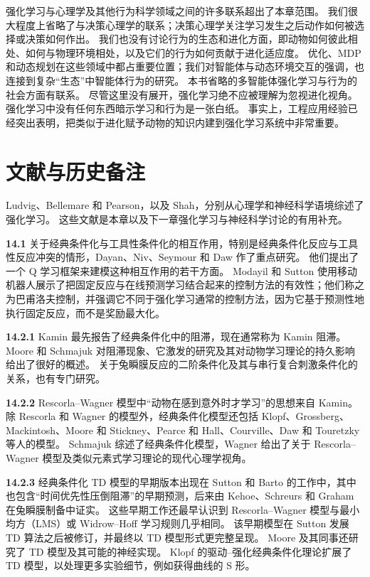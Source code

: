 \documentclass[UTF8, 12pt, fontset=fandol, oneside]{ctexart}
\begin{document}
强化学习与心理学及其他行为科学领域之间的许多联系超出了本章范围。
我们很大程度上省略了与决策心理学的联系；决策心理学关注学习发生之后动作如何被选择或决策如何作出。
我们也没有讨论行为的生态和进化方面，即动物如何彼此相处、如何与物理环境相处，以及它们的行为如何贡献于进化适应度。
优化、MDP 和动态规划在这些领域中都占重要位置；我们对智能体与动态环境交互的强调，也连接到复杂“生态”中智能体行为的研究。
本书省略的多智能体强化学习与行为的社会方面有联系。
尽管这里没有展开，强化学习绝不应被理解为忽视进化视角。
强化学习中没有任何东西暗示学习和行为是一张白纸。
事实上，工程应用经验已经突出表明，把类似于进化赋予动物的知识内建到强化学习系统中非常重要。

\section*{文献与历史备注}

Ludvig、Bellemare 和 Pearson，以及 Shah，分别从心理学和神经科学语境综述了强化学习。
这些文献是本章以及下一章强化学习与神经科学讨论的有用补充。

\noindent\textbf{14.1}
关于经典条件化与工具性条件化的相互作用，特别是经典条件化反应与工具性反应冲突的情形，Dayan、Niv、Seymour 和 Daw 作了重点研究。
他们提出了一个 Q 学习框架来建模这种相互作用的若干方面。
Modayil 和 Sutton 使用移动机器人展示了把固定反应与在线预测学习结合起来的控制方法的有效性；他们称之为巴甫洛夫控制，并强调它不同于强化学习通常的控制方法，因为它基于预测性地执行固定反应，而不是奖励最大化。

\noindent\textbf{14.2.1}
Kamin 最先报告了经典条件化中的阻滞，现在通常称为 Kamin 阻滞。
Moore 和 Schmajuk 对阻滞现象、它激发的研究及其对动物学习理论的持久影响给出了很好的概述。
关于兔瞬膜反应的二阶条件化及其与串行复合刺激条件化的关系，也有专门研究。

\noindent\textbf{14.2.2}
Rescorla--Wagner 模型中“动物在感到意外时才学习”的思想来自 Kamin。
除 Rescorla 和 Wagner 的模型外，经典条件化模型还包括 Klopf、Grossberg、Mackintosh、Moore 和 Stickney、Pearce 和 Hall、Courville、Daw 和 Touretzky 等人的模型。
Schmajuk 综述了经典条件化模型，Wagner 给出了关于 Rescorla--Wagner 模型及类似元素式学习理论的现代心理学视角。

\noindent\textbf{14.2.3}
经典条件化 TD 模型的早期版本出现在 Sutton 和 Barto 的工作中，其中也包含“时间优先性压倒阻滞”的早期预测，后来由 Kehoe、Schreurs 和 Graham 在兔瞬膜制备中证实。
这些早期工作还最早认识到 Rescorla--Wagner 模型与最小均方（LMS）或 Widrow--Hoff 学习规则几乎相同。
该早期模型在 Sutton 发展 TD 算法之后被修订，并最终以 TD 模型形式更完整呈现。
Moore 及其同事还研究了 TD 模型及其可能的神经实现。
Klopf 的驱动--强化经典条件化理论扩展了 TD 模型，以处理更多实验细节，例如获得曲线的 S 形。
\end{document}
